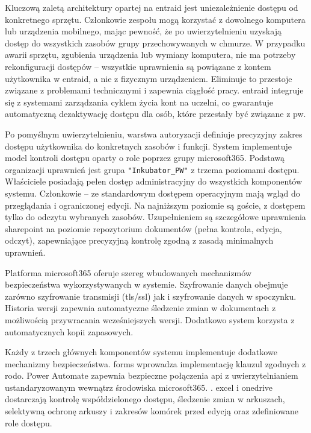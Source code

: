 Kluczową zaletą architektury opartej na \gls{entraid} jest uniezależnienie dostępu od konkretnego sprzętu. Członkowie zespołu mogą korzystać z dowolnego komputera lub urządzenia mobilnego, mając pewność, że po uwierzytelnieniu uzyskają dostęp do wszystkich zasobów grupy przechowywanych w chmurze. W przypadku awarii sprzętu, zgubienia urządzenia lub wymiany komputera, nie ma potrzeby rekonfiguracji dostępów – wszystkie uprawnienia są powiązane z kontem użytkownika w \gls{entraid}, a nie z fizycznym urządzeniem. Eliminuje to przestoje związane z problemami technicznymi i zapewnia ciągłość pracy.
\gls{entraid}  integruje się z systemami zarządzania cyklem życia kont na uczelni, co gwarantuje automatyczną dezaktywację dostępu dla osób, które przestały być związane z \gls{pw}. \cite{microsoft_entra_devices_2025} 

Po pomyślnym uwierzytelnieniu, warstwa autoryzacji definiuje precyzyjny zakres dostępu użytkownika do konkretnych zasobów i funkcji. System implementuje model kontroli dostępu oparty o role poprzez grupy \gls{microsoft365}. \cite{Microsoft365Groups2025} Podstawą organizacji uprawnień jest grupa \texttt{"Inkubator\_PW"} z trzema poziomami dostępu. 
Właściciele posiadają pełen dostęp administracyjny do wszystkich komponentów systemu. Członkowie – ze standardowym dostępem operacyjnym mają wgląd do przeglądania i ograniczonej edycji. Na najniższym poziomie są goście, z dostępem tylko do odczytu wybranych zasobów. Uzupełnieniem są szczegółowe uprawnienia \gls{sharepoint} na poziomie repozytorium dokumentów (pełna kontrola, edycja, odczyt), zapewniające precyzyjną kontrolę zgodną z zasadą minimalnych uprawnień.

Platforma \gls{microsoft365} oferuje szereg wbudowanych mechanizmów bezpieczeństwa wykorzystywanych w systemie. Szyfrowanie danych obejmuje zarówno szyfrowanie transmisji (\gls{tls}/\gls{ssl}) jak i szyfrowanie danych w spoczynku. \cite{microsoft_encryption_2024} Historia wersji zapewnia automatyczne śledzenie zmian w dokumentach z możliwością przywracania wcześniejszych wersji. Dodatkowo system korzysta z automatycznych kopii zapasowych.

Każdy z trzech głównych komponentów systemu implementuje dodatkowe mechanizmy bezpieczeństwa. \gls{forms} wprowadza implementację klauzul zgodnych z \gls{rodo}. Power Automate zapewnia bezpieczne połączenia \gls{api} z uwierzytelnianiem ustandaryzowanym wewnątrz środowiska \gls{microsoft365}. \cite{microsoft_encryption_2024}. \gls{excel} i \gls{onedrive} dostarczają kontrolę współdzielonego dostępu, śledzenie zmian w arkuszach, selektywną ochronę arkuszy i zakresów komórek przed edycją oraz zdefiniowane role dostępu. \cite{microsoft_office_versions_2025} \cite{microsoft_excel_blocking_2025}

